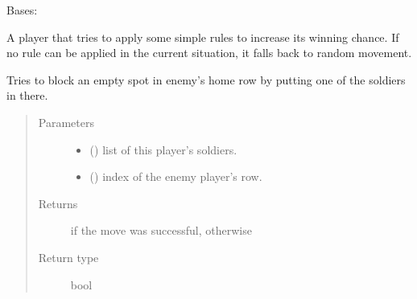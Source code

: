 \documentclass[letterpaper,10pt,english,openany,oneside]{sphinxmanual}
\begin{document}
\begin{fulllineitems}
\label{\detokenize{player:player.StrategyPlayer}}
Bases: {\hyperref[\detokenize{player:player.RandomPlayer}]{}}

A player that tries to apply some simple rules to increase its winning
chance. If no rule can be applied in the current situation, it falls
back to random movement.

\begin{fulllineitems}
\label{\detokenize{player:player.StrategyPlayer.block_enemy_row}}
Tries to block an empty spot in enemy’s home row by putting one of the
soldiers in there.
\begin{quote}\begin{description}
\item[{Parameters}] \leavevmode\begin{itemize}
\item {} 
 () \textendash{} list of this player’s soldiers.

\item {} 
 () \textendash{} index of the enemy player’s row.

\end{itemize}

\item[{Returns}] \leavevmode
{} if the move was successful,  otherwise

\item[{Return type}] \leavevmode
bool

\end{description}\end{quote}

\end{fulllineitems}



\end{fulllineitems}
\end{document}
